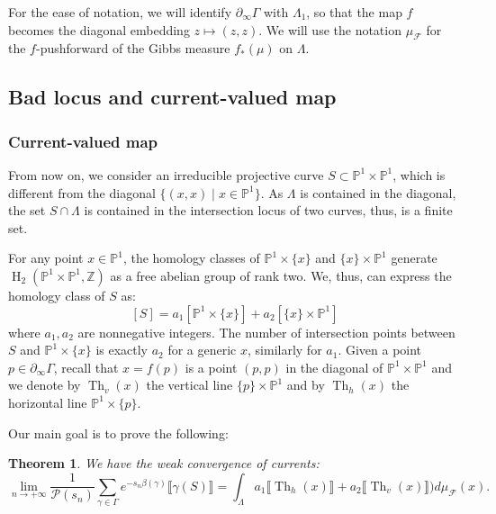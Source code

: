 \documentclass[12pt]{amsbook}%
\newtheorem{thm}{Theorem}[chapter]
\theoremstyle{definition}
\theoremstyle{remark}
\numberwithin{section}{chapter}
\numberwithin{subsection}{section}
\numberwithin{figure}{chapter}
\DeclareMathOperator{\Th}{Th}
\DeclareMathOperator{\coh}{H}
\newcommand\bac[1]{{\color{blue} #1} }
\newcommand\intcur[1]{\llbracket #1 \rrbracket}
\def\bZ{{\mathbb{Z}}}
\def\bP{{\mathbb{P}}}
\def\cF{{\mathscr{F}}}
\def\cP{{\mathscr{P}}}
\def\Ga{\Gamma}
\def\ga{\gamma}
\def\La{\Lambda}
\def\geo{\partial_\infty}
\begin{document}
{{{ For the ease of notation, we will identify $\geo \Ga$ with $\La_1$, so that the map $f$ becomes the diagonal embedding $z\mapsto (z,z)$. 
We will use the notation $\mu_{\cF}$ for the $f$-pushforward of the Gibbs measure $f_*(\mu)$ on $\La$.} 


\subsection{Bad locus and current-valued map}


\subsubsection{Current-valued map}\label{sec:illustration:Current-valued map}


From now on, we consider an irreducible projective curve $S\subset \bP^1\times \bP^1$, which is different from the diagonal $\{(x,x)\mid x\in \bP^1\}$. As 
$\Lambda$ is contained in the diagonal, the set $S\cap \Lambda$ is contained in the intersection locus of two curves, thus, is a finite set. 

For any point $x\in\bP^1$, the homology classes of $\bP^1\times \{x\}$ and $\{x\}\times \bP^1$ generate $\coh_2(\bP^1\times \bP^1,\bZ)$ as a free abelian group of rank two. We, thus, can express the homology class of $S$ as:
\[
[S]=a_1[\bP^1\times \{x\}]+a_2[\{x\}\times \bP^1]
\]
where $a_1, a_2$ are nonnegative integers. The number of intersection points between $S$ and $\bP^1\times \{x\}$ is exactly $a_2$ for a generic $x$, 
similarly for $a_1$.
 Given a point $p \in \partial_\infty \Ga$, recall that $x=f(p)$ is a point $(p,p)$ in the diagonal of  $\bP^1 \times \bP^1$  
and we denote by $\Th_v(x)$ the vertical line $\{p\} \times  \bP^1$ and by $\Th_h(x)$ the horizontal line $\bP^1 \times \{p\}$.

Our main goal is to prove the following:
\begin{thm}\label{ill_statement_two}
We have the weak convergence of currents:
\begin{equation}\label{eq:ill_eq_one}
\lim_{n\rightarrow +\infty}\frac{1}{\cP(s_n)}\sum_{\ga\in\Gamma}e^{-s_n\beta(\ga)}\llbracket \ga(S) \rrbracket= \int_{\Lambda} a_1 \intcur{\Th_h(x)}+ a_2 \intcur{\Th_v(x)} \big)d\mu_{\cF}(x).
\end{equation}
\end{thm}


}}
\end{document}
